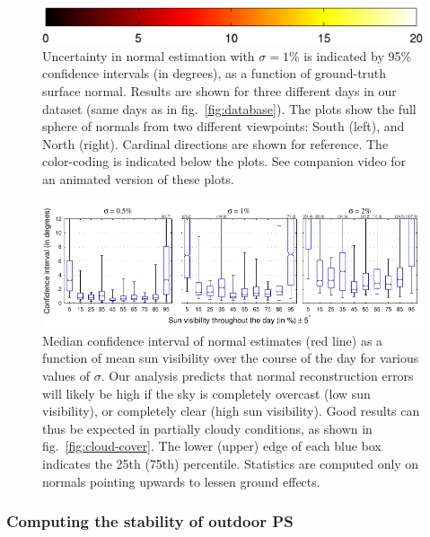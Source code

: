 \begin{figure}[t]
    \vspace{3mm}
    \includegraphics[width=.51\linewidth]{./figures/confidenceIntervals/colorbar.png}
    \caption{Uncertainty in normal estimation with $\sigma=1\%$ is indicated by 95\% confidence intervals (in degrees), as a function of ground-truth surface normal. Results are shown for three different days in our dataset (same days as in fig.~\ref{fig:database}). The plots show the full sphere of normals from two different viewpoints: South (left), and North (right). Cardinal directions are shown for reference. The color-coding is indicated below the plots. See companion video for an animated version of these plots.}
    \label{fig:confidence-intervals}
\end{figure}

\begin{figure}[t]
    \centering
    \includegraphics[width=.99\linewidth]{./figures/confidenceIntervals/sunVisibilityPlot-topHemisphere.pdf}
    \vspace{-2mm}
    \caption{Median confidence interval of normal estimates (red line) as a function of mean sun visibility over the course of the day for various values of $\sigma$. Our analysis predicts that normal reconstruction errors will likely be high if the sky is completely overcast (low sun visibility), or completely clear (high sun visibility). Good results can thus be expected in partially cloudy conditions, as shown in fig.~\ref{fig:cloud-cover}. The lower (upper) edge of each blue box indicates the 25th (75th) percentile. Statistics are computed only on normals pointing upwards to lessen ground effects.}
    \label{fig:cloud-cover-plot}
\end{figure}


\subsubsection{Computing the stability of outdoor PS}

